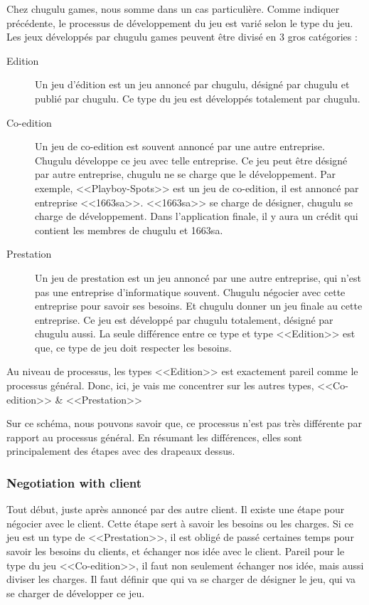 Chez chugulu games, nous somme dans un cas particulière. Comme indiquer précédente, le processus de développement du jeu est varié selon le type du jeu. Les jeux développés par chugulu games peuvent être divisé en 3 gros catégories : 

\begin{description}
	\item[Edition] Un jeu d'édition est un jeu annoncé par chugulu, désigné par chugulu et publié par chugulu. Ce type du jeu est développés totalement par chugulu.
	\item[Co-edition] Un jeu de co-edition est souvent annoncé par une autre entreprise. Chugulu développe ce jeu avec telle entreprise. Ce jeu peut être désigné par autre entreprise, chugulu ne se charge que le développement. Par exemple, <<Playboy-Spots>> est un jeu de co-edition, il est annoncé par entreprise <<1663sa>>. <<1663sa>> se charge de désigner, chugulu se charge de développement. Dans l'application finale, il y aura un crédit qui contient les membres de chugulu et 1663sa.
	\item[Prestation] Un jeu de prestation est un jeu annoncé par une autre entreprise, qui n'est pas une entreprise d'informatique souvent. Chugulu négocier avec cette entreprise pour savoir ses besoins. Et chugulu donner un jeu finale au cette entreprise. Ce jeu est développé par chugulu totalement, désigné par chugulu aussi. La seule différence entre ce type et type <<Edition>> est que, ce type de jeu doit respecter les besoins.
\end{description}

Au niveau de processus, les types <<Edition>> est exactement pareil comme le processus général. Donc, ici, je vais me concentrer sur les autres types, <<Co-edition>> \& <<Prestation>>


Sur ce schéma, nous pouvons savoir que, ce processus n'est pas très différente par rapport au processus général. En résumant les différences, elles sont principalement des étapes avec des drapeaux dessus. 

\subsubsection{Negotiation with client } %
\label{ssub:negotiation_with_client_}

Tout début, juste après annoncé par des autre client. Il existe une étape pour négocier avec le client. Cette étape sert à savoir les besoins ou les charges. Si ce jeu est un type de <<Prestation>>, il est obligé de passé certaines temps pour savoir les besoins du clients, et échanger nos idée avec le client. Pareil pour le type du jeu <<Co-edition>>, il faut non seulement échanger nos idée, mais aussi diviser les charges. Il faut définir que qui va se charger de désigner le jeu, qui va se charger de développer ce jeu.

